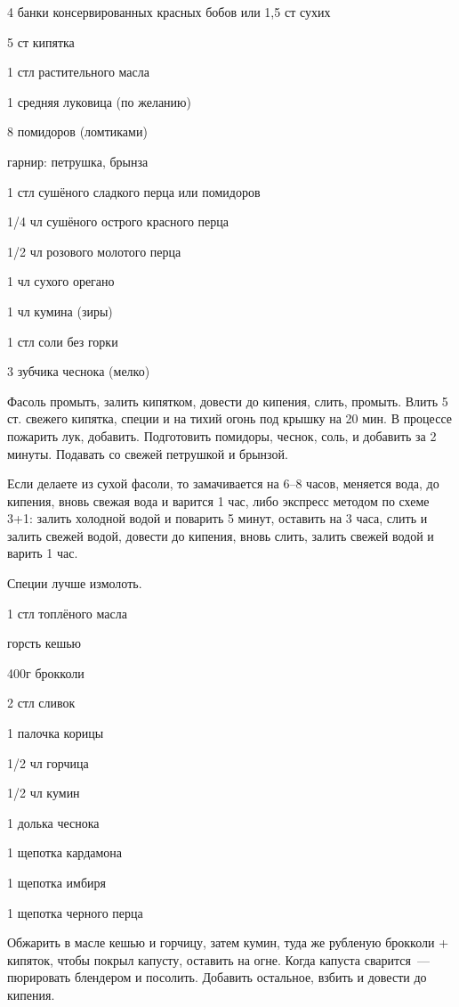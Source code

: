 {
\item 4 банки консервированных красных бобов или 1,5 ст сухих
\item 5 ст кипятка
\item 1 стл растительного масла
\item 1 средняя луковица (по желанию)
\item 8 помидоров (ломтиками)
\item гарнир: петрушка, брынза
}{
\item 1 стл сушёного сладкого перца или помидоров
\item 1/4 чл сушёного острого красного перца
\item 1/2 чл розового молотого перца
\item 1 чл сухого орегано
\item 1 чл кумина (зиры)
\item 1 стл соли без горки
\item 3 зубчика чеснока (мелко)
}{
Фасоль промыть, залить кипятком, довести до кипения, слить, промыть. Влить 5 ст. свежего кипятка, специи и на тихий огонь под крышку на 20 мин. В процессе пожарить лук, добавить. Подготовить помидоры, чеснок, соль, и добавить за 2 минуты. Подавать со свежей петрушкой и брынзой.

Если делаете из сухой фасоли, то замачивается на 6–8 часов, меняется вода, до кипения, вновь свежая вода и варится 1 час, либо экспресс методом по схеме 3+1: залить холодной водой и поварить 5 минут, оставить на 3 часа, слить и залить свежей водой, довести до кипения, вновь слить, залить свежей водой и варить 1 час.
}{
\begin{advice}
\item Специи лучше измолоть.
\end{advice}
}{}



{
\item 1 стл топлёного масла
\item горсть кешью
\item 400г брокколи
\item 2 стл сливок
}{
\item 1 палочка корицы
\item 1/2 чл горчица
\item 1/2 чл кумин 
\item 1 долька чеснока
\item 1 щепотка кардамона
\item 1 щепотка имбиря 
\item 1 щепотка черного перца
}{
Обжарить в масле кешью и горчицу, затем кумин, туда же рубленую брокколи + кипяток, чтобы покрыл капусту, оставить на огне. Когда капуста сварится~--- пюрировать блендером и посолить. Добавить остальное, взбить и довести до кипения.
}{}{}


